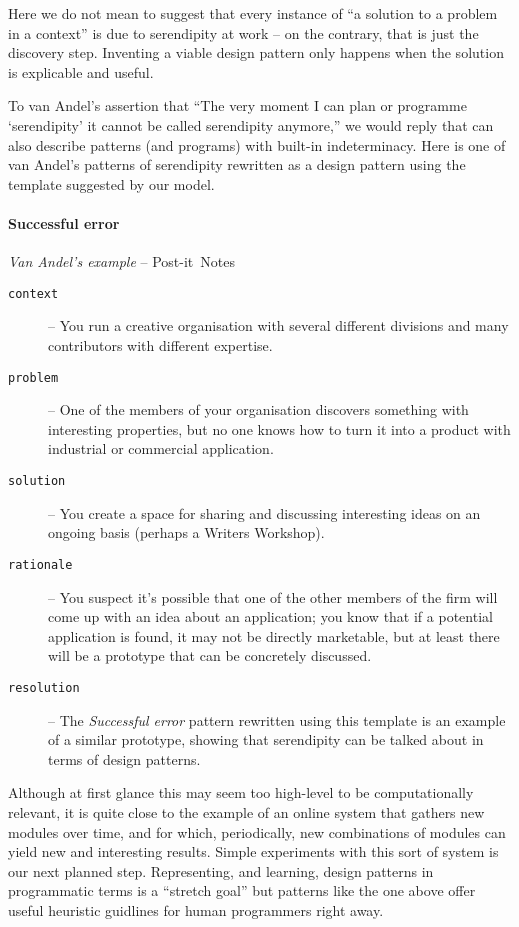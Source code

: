 Here we do not mean to suggest that every instance of ``a solution to a
problem in a context'' is due to serendipity at work -- on the
contrary, that is just the discovery step.  Inventing a viable design pattern
only happens when the solution is explicable and useful.

To van Andel's assertion that ``The very moment I can plan or
programme `serendipity' it cannot be called serendipity anymore,'' we
would reply that can also describe patterns (and programs) with
built-in indeterminacy.  Here is one of van Andel's patterns of
serendipity rewritten as a design pattern using the template suggested
by our model.

\begin{mdframed}
\vspace{-.35cm}
\paragraph{Successful error}
\emph{Van Andel's example} -- Post-it\texttrademark\ Notes\\[.05cm]
\begin{description}
\item[{\tt context}] -- You run a creative organisation with several different divisions and many contributors with different expertise.  
\item[{\tt problem}] -- One of the members of your organisation
  discovers something with interesting properties, but no one
  knows how to turn it into a product with industrial or commercial application.
\item[{\tt solution}] -- You create a space for sharing and discussing
  interesting ideas on an ongoing basis (perhaps a Writers Workshop).
\item[{\tt rationale}] -- You suspect it's possible that one of the
  other members of the firm will come up with an idea about an
  application; you know that if a potential application is found, it
  may not be directly marketable, but at least there will be a
  prototype that can be concretely discussed.
\item[{\tt resolution}] -- The \emph{Successful error} pattern
  rewritten using this template is an example of a similar
  prototype, showing that serendipity can be talked about in
  terms of design patterns.
\end{description}
\end{mdframed}

\bigskip

Although at first glance this may seem too high-level to be
computationally relevant, it is quite close to the example of an
online system that gathers new modules over time, and for which,
periodically, new combinations of modules can yield new and
interesting results.  Simple experiments with this sort of system is
our next planned step.  Representing, and learning, design patterns in
programmatic terms is a ``stretch goal'' but patterns like the one
above offer useful heuristic guidlines for human programmers right
away.
